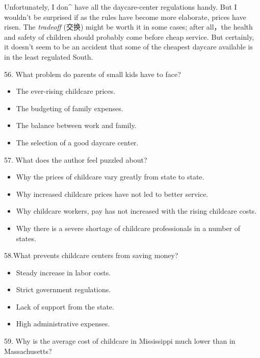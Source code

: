 \documentclass[UTF8,11pt]{ctexart}
\begin{document}
Unfortunately, I don\textasciicircum{} have all the daycare-center regulations handy. But I wouldn’t be surprised if as the rules have become more elaborate, prices have risen. The\textit{ tradeoff} (交换) might be worth it in some cases; after all，the health and safety of children should probably come before cheap service. But certainly, it doesn’t seem to be an accident that some of the cheapest daycare available is in the least regulated South.


56. What problem do parents of small kids have to face?


\begin{itemize}[leftmargin=2em,itemsep=.2em,topsep=.4em]\item[A.] The ever-rising childcare prices.
\item[B.] The budgeting of family expenses.
\item[C.] The balance between work and family.
\item[D.] The selection of a good daycare center.
\end{itemize}

57. What does the author feel puzzled about?


\begin{itemize}[leftmargin=2em,itemsep=.2em,topsep=.4em]\item[A.] Why the prices of childcare vary greatly from state to state.
\item[B.] Why increased childcare prices have not led to better service.
\item[C.] Why childcare workers, pay has not increased with the rising childcare costs.
\item[D.] Why there is a severe shortage of childcare professionals in a number of states.
\end{itemize}

58.What prevents childcare centers from saving money?


\begin{itemize}[leftmargin=2em,itemsep=.2em,topsep=.4em]\item[A.] Steady increase in labor costs.
\item[B.] Strict government regulations.
\item[C.] Lack of support from the state.
\item[D.] High administrative expenses.
\end{itemize}

59. Why is the average cost of childcare in Mississippi much lower than in Massachusetts?
\end{document}
